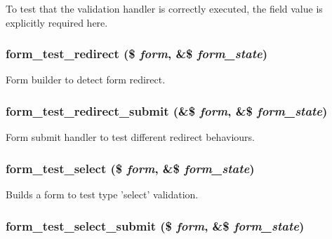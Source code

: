 To test that the validation handler is correctly executed, the field value is explicitly required here. \hypertarget{form__test_8module_aeb82e5f085c812b5a993016b064c7c18}{
\subsubsection[{form\_\-test\_\-redirect}]{\setlength{\rightskip}{0pt plus 5cm}form\_\-test\_\-redirect (\$ {\em form}, \/  \&\$ {\em form\_\-state})}}
\label{form__test_8module_aeb82e5f085c812b5a993016b064c7c18}
Form builder to detect form redirect. \hypertarget{form__test_8module_a42493f9a70b97494aa31111d1f00de64}{
\subsubsection[{form\_\-test\_\-redirect\_\-submit}]{\setlength{\rightskip}{0pt plus 5cm}form\_\-test\_\-redirect\_\-submit (\&\$ {\em form}, \/  \&\$ {\em form\_\-state})}}
\label{form__test_8module_a42493f9a70b97494aa31111d1f00de64}
Form submit handler to test different redirect behaviours. \hypertarget{form__test_8module_af51824c91c240871d4499e82a97fe40e}{
\subsubsection[{form\_\-test\_\-select}]{\setlength{\rightskip}{0pt plus 5cm}form\_\-test\_\-select (\$ {\em form}, \/  \&\$ {\em form\_\-state})}}
\label{form__test_8module_af51824c91c240871d4499e82a97fe40e}
Builds a form to test type 'select' validation. \hypertarget{form__test_8module_abb8b9a150d748f82041c68da125d830f}{
\subsubsection[{form\_\-test\_\-select\_\-submit}]{\setlength{\rightskip}{0pt plus 5cm}form\_\-test\_\-select\_\-submit (\$ {\em form}, \/  \&\$ {\em form\_\-state})}}

